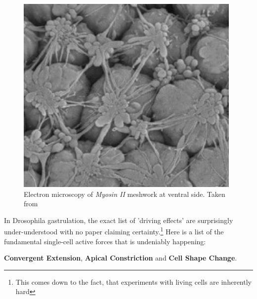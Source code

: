 
\begin{figure}[H]
    \centering
    \includegraphics[width=0.6\linewidth]{chapters/Theory/figures/EM_constricting_proteins.png}
    \caption{Electron microscopy of\textit{ Myosin II} meshwork at ventral side. Taken from }
    \label{fig:mysosinMeshwork}
\end{figure}






In Drosophila gastrulation, the exact list of 'driving effects' are surprisingly under-understood with no paper claiming certainty.\footnote{This comes down to the fact, that experiments with living cells are inherently hard} Here is a list of the fundamental single-cell active forces that is undeniably happening:

\textbf{Convergent Extension}, \textbf{Apical Constriction} and \textbf{Cell Shape Change}.


